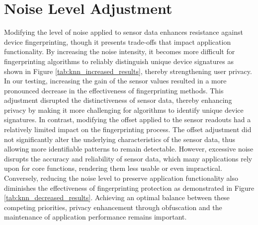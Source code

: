 \documentclass[11pt,
  oneside,openany,    %
]{scrreprt}
\begin{document}
\section{Noise Level Adjustment}
\label{sec:noise_level_adjustment}
Modifying the level of noise applied to sensor data enhances resistance against device fingerprinting, though it presents trade-offs that impact application functionality.
By increasing the noise intensity, it becomes more difficult for fingerprinting algorithms to reliably distinguish unique device signatures as shown in Figure \ref{tab:knn_increased_results}, thereby strengthening user privacy.
In our testing, increasing the gain of the sensor values resulted in a more pronounced decrease in the effectiveness of fingerprinting methods.
This adjustment disrupted the distinctiveness of sensor data, thereby enhancing privacy by making it more challenging for algorithms to identify unique device signatures.
In contrast, modifying the offset applied to the sensor readouts had a relatively limited impact on the fingerprinting process.
The offset adjustment did not significantly alter the underlying characteristics of the sensor data, thus allowing more identifiable patterns to remain detectable. 
However, excessive noise disrupts the accuracy and reliability of sensor data, which many applications rely upon for core functions, rendering them less usable or even impractical.
Conversely, reducing the noise level to preserve application functionality also diminishes the effectiveness of fingerprinting protection as demonstrated in Figure \ref{tab:knn_decreased_results}.
Achieving an optimal balance between these competing priorities, privacy enhancement through obfuscation and the maintenance of application performance remains important.
\end{document}

